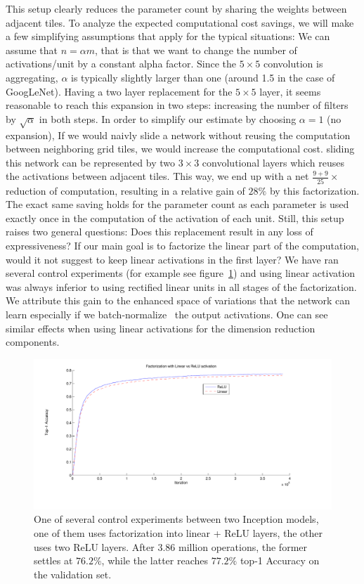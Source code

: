 This setup clearly reduces the parameter count
by sharing the weights between adjacent tiles.
To analyze the expected computational cost savings,
we will make a few simplifying assumptions that apply for the typical
situations: We can assume that $n=\alpha m$, that is that we want to change the
number of activations/unit by a constant alpha factor. Since the $5\times 5$
convolution is aggregating, $\alpha$ is typically slightly larger
than one (around 1.5 in the case of GoogLeNet). Having a two layer replacement
for the $5\times 5$ layer, it seems reasonable to reach this expansion in two
steps: increasing the number of filters by $\sqrt{\alpha}$ in both steps.
In order to simplify our estimate by choosing $\alpha=1$ (no expansion),
If we would naivly slide a network without reusing the computation between
neighboring grid tiles, we would increase the computational cost.
sliding this network can be represented by two $3\times 3$ convolutional layers
which reuses the activations between adjacent tiles.
This way, we end up with a net $\frac{9+9}{25}\times$ reduction
of computation, resulting in a relative gain of $28\%$ by this factorization.
The exact same saving holds for the parameter count as each parameter
is used exactly once in the computation of the activation of each unit.
Still, this setup raises two general questions: Does this replacement result in
any loss of expressiveness? If our main goal is to factorize the linear part of
the computation, would it not suggest to keep linear activations in
the first layer? We have ran several control experiments
(for example see figure~\ref{fig:factorization_comparison}) and using
linear activation was always inferior to using rectified linear units in
all stages of the factorization.
We attribute this gain to the enhanced space of variations that the network
can learn especially if we batch-normalize~\cite{ioffe2015batch} the
output activations. One can see similar effects when using linear activations
for the dimension reduction components.
\begin{figure}
\centering
\includegraphics[width=\linewidth]{factorization_comparison}
\caption{One of several control experiments between two Inception models,
  one of them uses factorization into linear + ReLU layers, the other uses
  two ReLU layers. After $3.86$ million operations, the former settles at
  $76.2\%$, while the latter reaches $77.2\%$ top-1 Accuracy on the
  validation set.}
\label{fig:factorization_comparison}
\end{figure}

